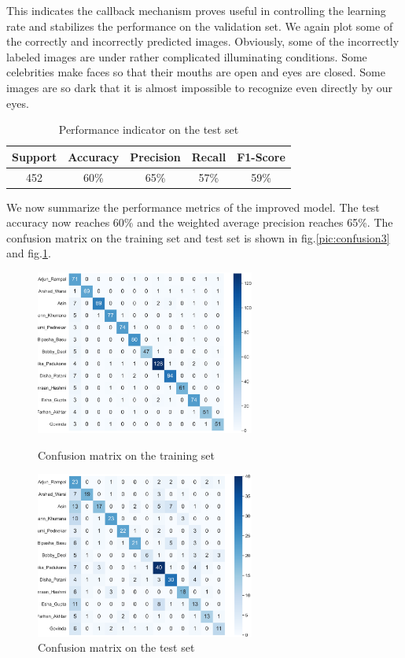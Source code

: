 This indicates the callback mechanism proves useful in controlling the learning rate and stabilizes the performance on the validation set. We again plot some of the correctly and incorrectly predicted images. Obviously, some of the incorrectly labeled images are under rather complicated illuminating conditions. Some celebrities make faces so that their mouths are open and eyes are closed. Some images are so dark that it is almost impossible to recognize even directly by our eyes. 
\begin{table}[!htbp]
    \small
	\centering
	\begin{tabularx}{0.6\textwidth}{ccccc}
		\toprule
		\textbf{Support}
       &  \textbf{Accuracy}
        & \textbf{Precision} 
        & \textbf{Recall} 
        & \textbf{F1-Score} \\

        \midrule
        452
        & 60\%
        & 65\%
        & 57\%
        & 59\%\\
		\bottomrule
	\end{tabularx}%
	\label{tab:result2}%
	\caption{Performance indicator on the test set}
\end{table}%
We now summarize the performance metrics of the improved model. The test accuracy now reaches 60\% and the weighted average precision reaches 65\%. The confusion matrix on the training set and test set is shown in fig.\ref{pic:confusion3} and fig.\ref{pic:confusion4}. 
\begin{figure}[H]
    \begin{minipage}[t]{0.49\textwidth}
        \centering\includegraphics[width=7.2cm]{./figures/cnn2_confusion_train.png}
        \caption{Confusion matrix on the training set}
        \label{pic:confusion3}
    \end{minipage}
    \qquad
    \begin{minipage}[t]{0.49\textwidth}
        \centering\includegraphics[width=7.2cm]{./figures/cnn2_confusion.png}
        \caption{Confusion matrix on the test set}
        \label{pic:confusion4}
    \end{minipage}
\end{figure}
